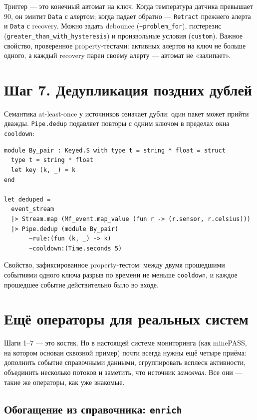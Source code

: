 \documentclass[11pt,a4paper]{article}
\begin{document}
Триггер --- это конечный автомат на ключ. Когда температура датчика
превышает 90, он эмитит \texttt{Data} с алертом; когда падает обратно
--- \texttt{Retract} прежнего алерта и \texttt{Data} с recovery. Можно
задать debounce (\texttt{\textasciitilde{}problem\_for}), гистерезис
(\texttt{greater\_than\_with\_hysteresis}) и произвольные условия
(\texttt{custom}). Важное свойство, проверенное property-тестами:
активных алертов на ключ не больше одного, а каждый recovery парен
своему алерту --- автомат не «залипает».

\section{Шаг 7. Дедупликация поздних дублей}

Семантика at-least-once у источников означает дубли: один пакет может
прийти дважды. \texttt{Pipe.dedup} подавляет повторы с одним ключом в
пределах окна \texttt{cooldown}:

\begin{lstlisting}
module By_pair : Keyed.S with type t = string * float = struct
  type t = string * float
  let key (k, _) = k
end

let deduped =
  event_stream
  |> Stream.map (Mf_event.map_value (fun r -> (r.sensor, r.celsius)))
  |> Pipe.dedup (module By_pair)
       ~rule:(fun (k, _) -> k)
       ~cooldown:(Time.seconds 5)
\end{lstlisting}

Свойство, зафиксированное property-тестом: между двумя прошедшими
событиями одного ключа разрыв по времени не меньше \texttt{cooldown},
и каждое прошедшее событие действительно было во входе.

\section{Ещё операторы для реальных систем}

Шаги 1--7 --- это костяк. Но в настоящей системе мониторинга (как
minePASS, на котором основан сквозной пример) почти всегда нужны ещё
четыре приёма: дополнить событие справочными данными, сгруппировать
всплеск активности, объединить несколько потоков и заметить, что
источник \emph{замолчал}. Все они --- такие же операторы, как уже
знакомые.

\subsection{Обогащение из справочника: \texttt{enrich}}
\end{document}
